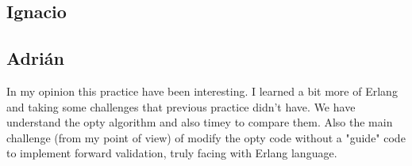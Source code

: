 \documentclass[a4paper, 10pt]{article}
\begin{document}
\subsection{Ignacio}

\subsection{Adrián}

In my opinion this practice have been interesting. I learned a bit more of Erlang and taking some challenges that previous practice didn't have. We have understand the opty algorithm and also timey to compare them. Also the main challenge (from my point of view) of modify the opty code without a "guide" code to implement forward validation, truly facing with Erlang language.
\end{document}
